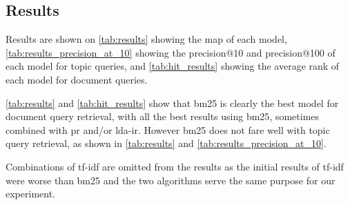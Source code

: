 \subsection{Results}\label{subsec:results}

Results are shown on \autoref{tab:results} showing the \acrlong{map} of each model, \autoref{tab:results_precision_at_10} showing the precision@10 and precision@100 of each model for topic queries, and \autoref{tab:hit_results} showing the average rank of each model for document queries.


\autoref{tab:results} and \autoref{tab:hit_results} show that \gls{bm25} is clearly the best model for document query retrieval, with all the best results using \gls{bm25}, sometimes combined with \gls{pr} and/or \gls{lda}-\gls{ir}. 
However \gls{bm25} does not fare well with topic query retrieval, as shown in \autoref{tab:results} and \autoref{tab:results_precision_at_10}.

Combinations of \gls{tf-idf} are omitted from the results as the initial results of \gls{tf-idf} were worse than \gls{bm25} and the two algorithms serve the same purpose for our experiment.


